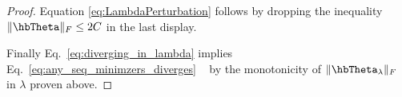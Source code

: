 \begin{proof}
Equation \eqref{eq:LambdaPerturbation} follows by dropping the 
inequality $\|\hbTheta\|_F\le 2C$ in the last display.
 
\vspace{0.15cm}

Finally Eq.~\eqref{eq:diverging_in_lambda} implies Eq.~\eqref{eq:any_seq_minimzers_diverges} ~ by
the monotonicity of $\|\hbTheta_{\lambda}\|_F$ in $\lambda$ proven above.
\end{proof}
%
%
%

%
%
%
%


